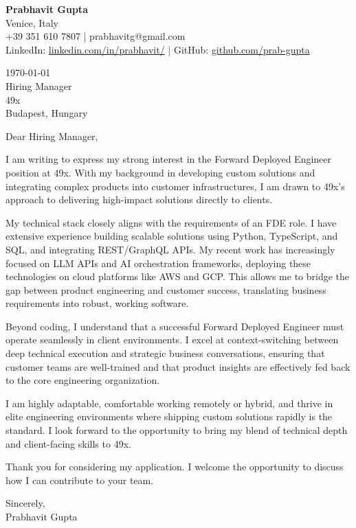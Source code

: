 \documentclass[11pt,a4paper]{article}
\begin{document}
\begin{flushleft}
\textbf{Prabhavit Gupta}\\
Venice, Italy\\
+39 351 610 7807 | prabhavitg@gmail.com\\
LinkedIn: \href{https://www.linkedin.com/in/prabhavit/}{linkedin.com/in/prabhavit/} | GitHub: \href{https://github.com/prab-gupta}{github.com/prab-gupta}
\end{flushleft}

\vspace{1em}

\begin{flushleft}
\today\\
\vspace{1em}
Hiring Manager\\
49x\\
Budapest, Hungary
\end{flushleft}

\vspace{1em}

Dear Hiring Manager,

I am writing to express my strong interest in the Forward Deployed Engineer position at 49x. With my background in developing custom solutions and integrating complex products into customer infrastructures, I am drawn to 49x's approach to delivering high-impact solutions directly to clients.

My technical stack closely aligns with the requirements of an FDE role. I have extensive experience building scalable solutions using Python, TypeScript, and SQL, and integrating REST/GraphQL APIs. My recent work has increasingly focused on LLM APIs and AI orchestration frameworks, deploying these technologies on cloud platforms like AWS and GCP. This allows me to bridge the gap between product engineering and customer success, translating business requirements into robust, working software.

Beyond coding, I understand that a successful Forward Deployed Engineer must operate seamlessly in client environments. I excel at context-switching between deep technical execution and strategic business conversations, ensuring that customer teams are well-trained and that product insights are effectively fed back to the core engineering organization. 

I am highly adaptable, comfortable working remotely or hybrid, and thrive in elite engineering environments where shipping custom solutions rapidly is the standard. I look forward to the opportunity to bring my blend of technical depth and client-facing skills to 49x.

Thank you for considering my application. I welcome the opportunity to discuss how I can contribute to your team.

Sincerely,\\
\vspace{1em}
Prabhavit Gupta
\end{document}
